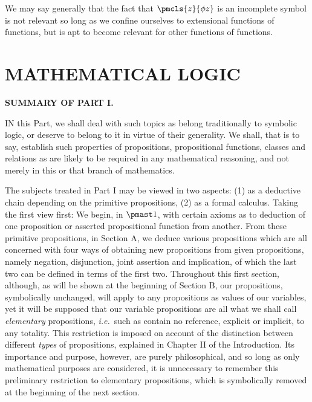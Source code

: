 \documentclass[letterpaper,12pt,openany,leqno]{book}
\newcommand{\pagefirst}[1]{\marginnote[\boxed{\text{#1}}]{\boxed{\text{#1}}}}
\begin{document}
We may say generally that the fact that $\pmcls{z}{\phi z}$ is an incomplete symbol is not relevant so long as we confine ourselves to extensional functions of functions, but is apt to become relevant for other functions of functions.

\part{MATHEMATICAL LOGIC} %
\begin{center} \textbf{SUMMARY OF PART I.} \end{center}\pagefirst{91} 

IN this Part, we shall deal with such topics as belong traditionally to symbolic logic, or deserve to belong to it in virtue of their generality. We shall, that is to say, establish such properties of propositions, propositional functions, classes and relations as are likely to be required in any mathematical reasoning, and not merely in this or that branch of mathematics.

The subjects treated in Part I may be viewed in two aspects: (1) as a deductive chain depending on the primitive propositions, (2) as a formal calculus. Taking the first view first: We begin, in $\pmast1$, with certain axioms as to deduction of one proposition or asserted propositional function from another. From these primitive propositions, in Section A, we deduce various propositions which are all concerned with four ways of obtaining new propositions from given propositions, namely negation, disjunction, joint assertion and implication, of which the last two can be defined in terms of the first two. Throughout this first section, although, as will be shown at the beginning of Section B, our propositions, symbolically unchanged, will apply to any propositions as values of our variables, yet it will be supposed that our variable propositions are all what we shall call \textit{elementary} propositions, \textit{i.e.}\ such as contain no reference, explicit or implicit, to any totality. This restriction is imposed on account of the distinction between different \textit{types} of propositions, explained in Chapter II of the Introduction. Its importance and purpose, however, are purely philosophical, and so long as only mathematical purposes are considered, it is unnecessary to remember this preliminary restriction to elementary propositions, which is symbolically removed at the beginning of the next section. 
\end{document}
